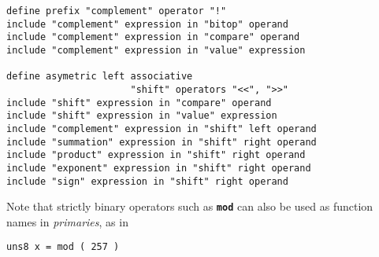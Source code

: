 \documentclass[12pt]{article}
\newcommand{\TT}[1]{{\tt \bfseries #1}}
\newenvironment{indpar}[1][0.3in]%
	{\begin{list}{}%
		     {\setlength{\itemsep}{0in}%
		      \setlength{\topsep}{0in}%
		      \setlength{\parsep}{1ex}%
		      \setlength{\labelwidth}{#1}%
		      \setlength{\leftmargin}{#1}%
		      \addtolength{\leftmargin}{\labelsep}}%
	 \item}%
	{\end{list}}
\begin{document}
\begin{indpar}
\begin{verbatim}
define prefix "complement" operator "!"
include "complement" expression in "bitop" operand
include "complement" expression in "compare" operand
include "complement" expression in "value" expression

define asymetric left associative
                      "shift" operators "<<", ">>"
include "shift" expression in "compare" operand
include "shift" expression in "value" expression
include "complement" expression in "shift" left operand
include "summation" expression in "shift" right operand
include "product" expression in "shift" right operand
include "exponent" expression in "shift" right operand
include "sign" expression in "shift" right operand

\end{verbatim}\end{indpar}


Note that strictly binary operators such as \TT{mod} can also
be used as function names in {\em primaries}, as in
\begin{center}
{\tt uns8 x = mod ( 257 )}
\end{center}
\end{document}
